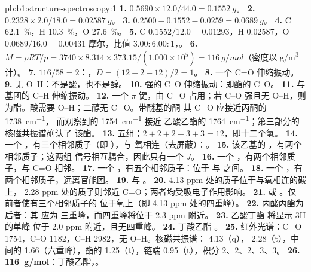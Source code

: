 \begin{solution}{pb:b1:structure-spectroscopy:1}
\textbf{1.} $0.5690 \times 12.0/44.0 = \qty{0.1552}{g}$。
\textbf{2.} $0.2328 \times 2.0/18.0 = \qty{0.02587}{g}$。
\textbf{3.} $0.2500 - 0.1552 - 0.0259 = \qty{0.0689}{g}$。
\textbf{4.} C \qty{62.1}{\percent}，H \qty{10.3}{\percent}，O
\qty{27.6}{\percent}。
\textbf{5.} C $0.1552/12.0 = 0.01293$，H $0.02587$，O $0.0689/16.0 =
0.00431$ 摩尔，比值 $3.00 : 6.00 : 1$，。
\textbf{6.} $M = \rho RT/p = 3740 \times 8.314 \times 373.15/(1.000 \times 10^5) =
\qty{116}{g/mol}$（密度以 \unit{g/m^3} 计）。
\textbf{7.} $116/58 = 2$：，$D = (12 + 2 - 12)/2 = 1$。
\textbf{8.} 一个 C=O 伸缩振动。
\textbf{9.} 无 O--H：不是酸，也不是醇。
\textbf{10.} 强的 C--O 伸缩振动：即酯的 C--O。
\textbf{11.}  与  基团的 C--H 伸缩振动。
\textbf{12.} 一个 $\pi$ 键，由 C=O 占用；若 C--O 强且无
O--H，则为酯。酸需要 O--H；二醇无 C=O。带醚基的酮
其 C=O 应接近丙酮的 \qty{1738}{cm^{-1}}，
而观察到的 \qty{1754}{cm^{-1}} 接近
乙酸乙酯的 \qty{1764}{cm^{-1}}；第三部分的核磁共振谱确认了
该酯。
\textbf{13.} 五组；$2 + 2 + 2 + 3 + 3 = 12$，即十二个氢。
\textbf{14.} 一个 ，有三个相邻质子（即 ），与
氧相连（去屏蔽）：。
\textbf{15.} 该乙基的 ，有两个相邻质子；这两组
信号相互耦合，因此只有一个 $J$。
\textbf{16.} 一个 ，有两个相邻质子，与 C=O 相邻。
\textbf{17.} 一个 ，有五个相邻质子：位于  与
 之间。
\textbf{18.} 一个 ，有两个相邻质子，远离官能团。
\textbf{19.}  与 。
\textbf{20.} 4.13 ppm 处的质子位于与氧相连的碳上，
2.28 ppm 处的质子则邻近 C=O；两者均受吸电子作用影响。
\textbf{21.}  或 。仅
前者使有三个相邻质子的  位于氧上（即
4.13 ppm 处的四重峰）。
\textbf{22.} 丙酸丙酯为后者：其  应为
三重峰，而四重峰将位于 2.3 ppm 附近。
\textbf{23.} 乙酸丁酯  将显示 3H 的单峰
位于 2.0 ppm 附近，且无四重峰。
\textbf{24.} 丁酸乙酯 。
\textbf{25.} 红外光谱：C=O 1754，C--O 1182，C--H 2982，无 O--H。核磁共振谱：
4.13（q）， 2.28（t），中间的  1.66（六重峰），酯的
 1.25（t），链端  0.95（t），积分 2、2、2、3、3。
\textbf{26.} \textbf{\qty{116}{g/mol}}：丁酸乙酯，。
\end{solution}
